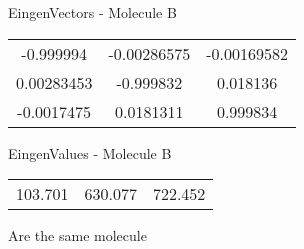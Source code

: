 \begin{multicols}{2}
\begin{center}
\vtab
 EingenVectors - Molecule B     \\
\vtab
\begin{tabular}{|c c c|}
-0.999994	 & 	-0.00286575	 & 	-0.00169582	 \\
0.00283453	 & 	-0.999832	 & 	0.018136	 \\
-0.0017475	 & 	0.0181311	 & 	0.999834
\end{tabular}

\vtab
 EingenValues - Molecule B     \\
\vtab
\begin{tabular}{|c c c|}
103.701	 & 	630.077	 & 	722.452
\end{tabular}

\end{center}
\end{multicols}
\begin{center}
\vtab
\vtab
\textcolor{NavyBlue}{\Large Are the same molecule}
\end{center}
\newpage

